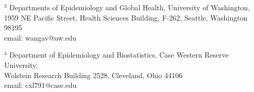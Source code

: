 \documentclass[12pt, usenatbib]{article}
\begin{document}
\begin{center}
\bigskip
\bigskip

$^3$ Departments of Epidemiology and Global Health, University of Washington, \\ 1959 NE Pacific Street, Health Sciences Building, F-262, Seattle, Washington 98195 \\ email: wangav@uw.edu

\bigskip
\bigskip

$^4$ Department of Epidemiology and Biostatistics, Case Western Reserve University, \\ Wolstein Research Building 2528, Cleveland, Ohio 44106  \\ email:  cxl791@case.edu



\bigskip
\bigskip
\bigskip
\bigskip
\bigskip
\bigskip
\bigskip
\bigskip


\bigskip
\bigskip



\bigskip
\bigskip

\end{center}




\setlength{\baselineskip}{14pt}

\newpage


\raggedright


\def\baselinestretch{2}\small\normalsize%


\normalsize

\bigskip
\bigskip
\bigskip


\newpage
\end{document}
